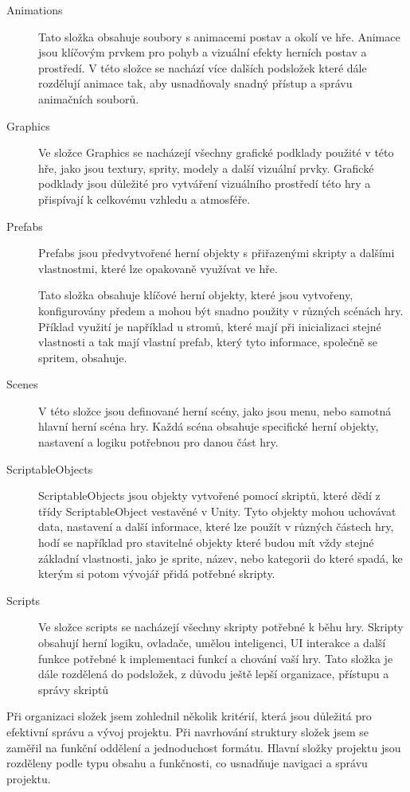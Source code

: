 \begin{description}
	\item[Animations] Tato složka obsahuje soubory s animacemi postav a okolí ve hře. Animace jsou klíčovým prvkem pro pohyb a vizuální efekty herních postav a prostředí. V této složce se nachází více dalších podsložek které dále rozdělují animace tak, aby usnadňovaly snadný přístup a správu animačních souborů.
	\item[Graphics] Ve složce Graphics se nacházejí všechny grafické podklady použité v této hře, jako jsou textury, sprity, modely a další vizuální prvky. Grafické podklady jsou důležité pro vytváření vizuálního prostředí této hry a přispívají k celkovému vzhledu a atmosféře.
	\item[Prefabs] Prefabs jsou předvytvořené herní objekty s přiřazenými skripty a dalšími vlastnostmi, které lze opakovaně využívat ve hře.
	
	Tato složka obsahuje klíčové herní objekty, které jsou vytvořeny, konfigurovány předem a mohou být snadno použity v různých scénách hry. Příklad využití je například u stromů, které mají při inicializaci stejné vlastnosti a tak mají vlastní prefab, který tyto informace, společně se spritem, obsahuje.
	\item[Scenes] V této složce jsou definované herní scény, jako jsou menu, nebo samotná hlavní herní scéna hry. Každá scéna obsahuje specifické herní objekty, nastavení a logiku potřebnou pro danou část hry.
	\item[ScriptableObjects] ScriptableObjects jsou objekty vytvořené pomocí skriptů, které dědí z třídy ScriptableObject vestavěné v Unity. Tyto objekty mohou uchovávat data, nastavení a další informace, které lze použít v různých částech hry, hodí se například pro stavitelné objekty které budou mít vždy stejné základní vlastnosti, jako je sprite, název, nebo kategorii do které spadá, ke kterým si potom vývojář přidá potřebné skripty.
	\item[Scripts] Ve složce scripts se nacházejí všechny skripty potřebné k běhu hry. Skripty obsahují herní logiku, ovladače, umělou inteligenci, UI interakce a další funkce potřebné k implementaci funkcí a chování vaší hry. Tato složka je dále rozdělená do podsložek, z důvodu ještě lepší organizace, přístupu a správy skriptů
\end{description}

Při organizaci složek jsem zohlednil několik kritérií, která jsou důležitá pro efektivní správu a vývoj projektu. Při navrhování struktury složek jsem se zaměřil na funkční oddělení a jednoduchost formátu. Hlavní složky projektu jsou rozděleny podle typu obsahu a funkčnosti, co usnadňuje navigaci a správu projektu.


